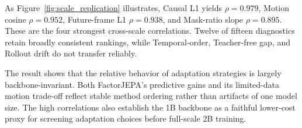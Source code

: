 As Figure~\ref{fig:scale_replication} illustrates, Causal L1 yields
$\rho=0.979$, Motion cosine $\rho=0.952$, Future-frame L1
$\rho=0.938$, and Mask-ratio slope $\rho=0.895$. These are the four strongest
cross-scale correlations. Twelve of fifteen diagnostics retain broadly
consistent rankings, while Temporal-order, Teacher-free gap, and Rollout drift
do not transfer reliably.

The result shows that the relative behavior of adaptation strategies is largely
backbone-invariant. Both FactorJEPA's predictive gains and its limited-data
motion trade-off reflect stable method ordering rather than artifacts of one
model size. The high correlations also establish the 1B backbone as a faithful
lower-cost proxy for screening adaptation choices before full-scale 2B
training.













































